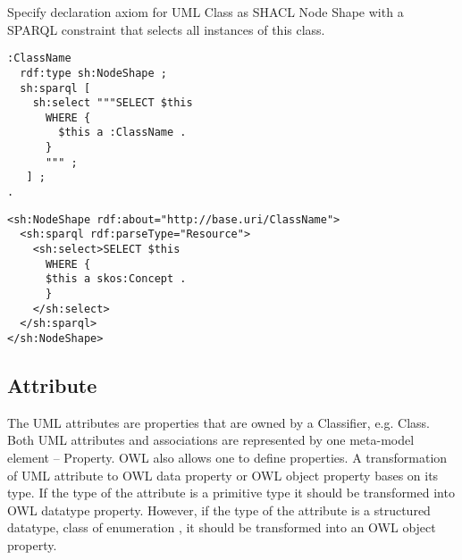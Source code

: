 \begin{trule}
	\label{rule:class-abstract-ds}
	Specify declaration axiom for UML Class as SHACL Node Shape with a SPARQL constraint that selects all instances of this class.
\end{trule}

\vspace{-\parskip}
\begin{minipage}[b]{.47\textwidth}
\begin{lstlisting}[language=Turtle, caption={Instance checking constraint in Turtle syntax}, captionpos=b]
:ClassName
  rdf:type sh:NodeShape ;
  sh:sparql [
    sh:select """SELECT $this
      WHERE {
        $this a :ClassName .
      }
      """ ;
   ] ;
.
\end{lstlisting}
\end{minipage}%
\quad
\begin{minipage}[b]{.5\textwidth}
\begin{lstlisting}[language=RDF/XML, caption={Instance checking constraint in RDF/XML syntax}, captionpos=b]
<sh:NodeShape rdf:about="http://base.uri/ClassName">
  <sh:sparql rdf:parseType="Resource">  
    <sh:select>SELECT $this
      WHERE {
      $this a skos:Concept .
      }
    </sh:select>
  </sh:sparql>
</sh:NodeShape>
\end{lstlisting}
\end{minipage}

\subsection{Attribute}
\label{sec:attribute}

The UML attributes \citep{uml2.5} are properties that are owned by a Classifier, e.g. Class. Both UML attributes and associations are represented by one meta-model element -- Property. OWL also allows one to define properties. A transformation of UML attribute to OWL data property or OWL object property bases on its type. If the type of the attribute is a primitive type it should be transformed into OWL datatype property. However, if the type of the attribute is a structured datatype, class of enumeration , it should be transformed into an OWL object property.

